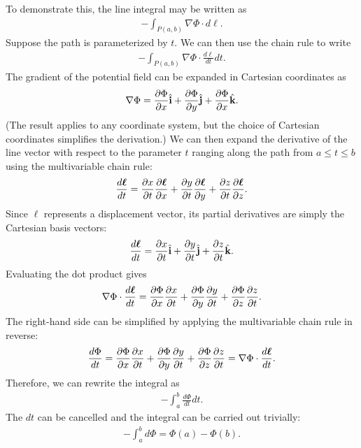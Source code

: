 To demonstrate this, the line integral may be written as
\begin{align}
  - \int_{P(a,b)} \nabla \Phi \cdot d\boldsymbol\ell .
\end{align}
Suppose the path is parameterized by $t$. We can then use the chain rule to write
\begin{align}
  - \int_{P(a,b)} \nabla \Phi \cdot \frac{d\boldsymbol\ell}{dt} dt .
\end{align}
The gradient of the potential field can be expanded in Cartesian coordinates as
\begin{align}
  \nabla \Phi = \frac{ \partial {\Phi} }{ \partial {x} } \hat{\mathbf{i}} + \frac{ \partial {\Phi} }{ \partial {y} } \hat{\mathbf{j}} + \frac{ \partial {\Phi} }{ \partial {x} } \hat{\mathbf{k}} .
\end{align}
(The result applies to any coordinate system, but the choice of Cartesian coordinates simplifies the derivation.) We can then expand the derivative of the line vector with respect to the parameter $t$ ranging along the path from $a \le t \le b$ using the multivariable chain rule:
\begin{align}
  \frac{d\boldsymbol\ell}{dt} = \frac{ \partial {x} }{ \partial {t} } \frac{ \partial {\boldsymbol\ell} }{ \partial {x} } + \frac{ \partial {y} }{ \partial {t} } \frac{ \partial {\boldsymbol\ell} }{ \partial {y} } + \frac{ \partial {z} }{ \partial {t} } \frac{ \partial {\boldsymbol\ell} }{ \partial {z} } .
\end{align}
Since $\boldsymbol\ell$ represents a displacement vector, its partial derivatives are simply the Cartesian basis vectors:
\begin{align}
  \frac{d\boldsymbol\ell}{dt} = \frac{ \partial {x} }{ \partial {t} } \hat{\mathbf{i}} + \frac{ \partial {y} }{ \partial {t} } \hat{\mathbf{j}} + \frac{ \partial {z} }{ \partial {t} } \hat{\mathbf{k}} .
\end{align}
Evaluating the dot product gives
\begin{align}
  \nabla \Phi \cdot \frac{d\boldsymbol\ell}{dt} = \frac{ \partial {\Phi} }{ \partial {x} } \frac{ \partial {x} }{ \partial {t} } + \frac{ \partial {\Phi} }{ \partial {y} } \frac{ \partial {y} }{ \partial {t} } + \frac{ \partial {\Phi} }{ \partial {z} } \frac{ \partial {z} }{ \partial {t} } .
\end{align}
The right-hand side can be simplified by applying the multivariable chain rule in reverse:
\begin{align}
  \frac{ d \Phi }{ dt } = \frac{ \partial {\Phi} }{ \partial {x} } \frac{ \partial {x} }{ \partial {t} } + \frac{ \partial {\Phi} }{ \partial {y} } \frac{ \partial {y} }{ \partial {t} } + \frac{ \partial {\Phi} }{ \partial {z} } \frac{ \partial {z} }{ \partial {t} } = \nabla \Phi \cdot \frac{d\boldsymbol\ell}{dt}.
\end{align}
Therefore, we can rewrite the integral as
\begin{align}
  - \int_a^b \frac{ d \Phi }{ dt } dt .
\end{align}
The $dt$ can be cancelled and the integral can be carried out trivially:
\begin{align}
  - \int_a^b d \Phi = \Phi(a) - \Phi(b) .
\end{align}


